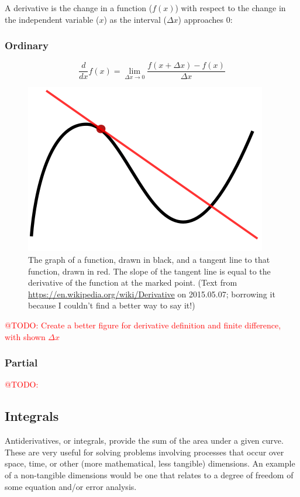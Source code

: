 \documentclass[a4paper,10pt]{scrartcl}
\makeatletter
\newcommand{\todo}[1]{\textcolor{red}{@TODO: #1}}
\makeatother
\begin{document}
A derivative is the change in a function ($f(x)$) with respect to the change in the independent variable ($x$) as the interval ($\Delta x$) approaches 0:

\subsubsection{Ordinary}

\begin{equation}
 \frac{d}{{dx}}f\left( x \right) = \mathop {\lim }\limits_{\Delta x \to 0} \frac{{f\left( {x + \Delta x } \right) - f\left( x \right)}}{\Delta x }
\end{equation}

\begin{figure}[!ht]
\begin{center}
\includegraphics[width=.5\linewidth]{figures/NumericalAndMath/400px-Tangent_to_a_curve.png}
\end{center}
\caption{The graph of a function, drawn in black, and a tangent line to that function, drawn in red. The slope of the tangent line is equal to the derivative of the function at the marked point. (Text from \url{https://en.wikipedia.org/wiki/Derivative} on 2015.05.07; borrowing it because I couldn't find a better way to say it!)}
\end{figure}

\todo{Create a better figure for derivative definition and finite difference, with shown $\Delta x$}

\subsubsection{Partial}

\todo{}

\subsection{Integrals}

Antiderivatives, or integrals, provide the sum of the area under a given curve. These are very useful for solving problems involving processes that occur over space, time, or other (more mathematical, less tangible) dimensions. An example of a non-tangible dimensions would be one that relates to a degree of freedom of some equation and/or error analysis.
\end{document}

